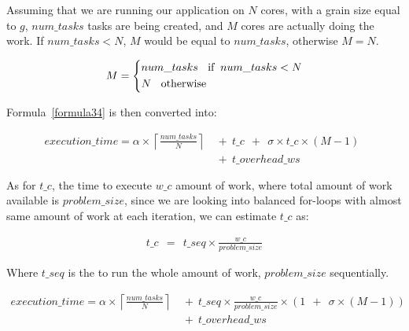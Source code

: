 Assuming that we are running our application on $N$ cores, with a grain size equal to $g$, $num\_{tasks}$ tasks are being created, and $M$ cores are actually doing the work. If $num\_{tasks}<N$, $M$ would be equal to $num\_{tasks}$, otherwise $M=N$.

\begin{equation}\label{formula19}
M=\left\{
\begin{aligned}
&num\_{tasks} \text{\:\:\:\:if \:} num\_{tasks}<N\\
&N \text{\:\:\:\:otherwise}
\end{aligned}
\right.
\end{equation}


Formula~\ref{formula34} is then converted into:

\begin{equation}\label{formula1}
\begin{aligned}
execution\_time = 
\alpha\times{\left\lceil{\frac{num\_{tasks}}{N}}\right\rceil}\:\:&+\:\:t\_c\:\:+\:\:\sigma\times{t\_c}\times{(M-1)}\:\:\\
&+\:\:t\_{overhead\_{ws}}
\end{aligned}
\end{equation}


As for $t\_{c}$, the time to execute $w\_{c}$ amount of work, where total amount of work available is $problem\_{size}$, since we are looking into balanced for-loops with almost same amount of work at each iteration, we can estimate $t\_{c}$ as:

\begin{equation}\label{formula41}
\begin{aligned}
t\_{c}\:\:=\:\:t\_{seq}\times{\frac{w\_c}{problem\_{size}}}
\end{aligned}
\end{equation}

Where $t\_{seq}$ is the to run the whole amount of work, $problem\_{size}$ sequentially.

\begin{equation}\label{formula42}
\begin{aligned}
execution\_time = 
\alpha\times{\left\lceil{\frac{num\_{tasks}}{N}}\right\rceil}\:\:&+\:\:t\_{seq}\times{\frac{w\_c}{problem\_{size}}}\times{(1\:\:+\:\:\sigma\times{(M-1)})}\:\:\\
&+\:\:t\_{overhead\_{ws}}\\
\end{aligned}
\end{equation}


